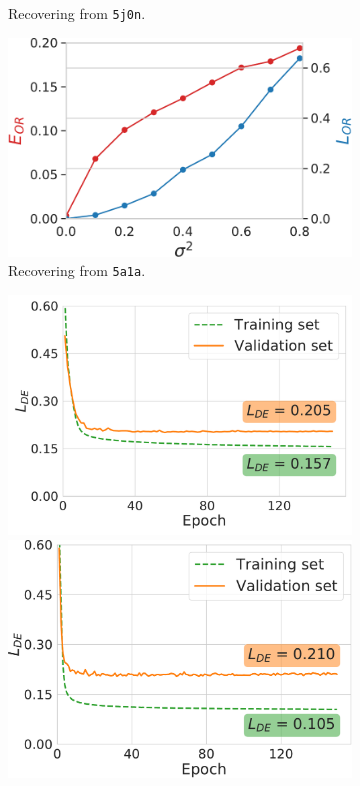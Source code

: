 \begin{figure}
\begin{minipage}[b]{0.48\linewidth}
\begin{subfigure}[b]{0.49\linewidth}
            \caption{Recovering from \texttt{5j0n}.}
        \end{subfigure}
        \hfill
        \begin{subfigure}[b]{0.49\linewidth}
        \centering
            \includegraphics[width=\linewidth]{figures/5a1a_perfect_noisy_ar_aa}
            \caption{Recovering from \texttt{5a1a}.}
        \end{subfigure}
        \caption{%
            Orientation recovery from perturbed distances.
        }\label{fig:perfect-with-noise-ar-aa}
    \end{minipage}
    \hfill
    \begin{minipage}[b]{0.45\linewidth}
        \begin{subfigure}[b]{\linewidth}
            \centering
            \includegraphics[width=0.47\linewidth]{figures/de_5j0n_fullcov.pdf}
            \hfill
            \includegraphics[width=0.47\linewidth]{figures/de_5a1a.pdf}

\end{subfigure}
\end{minipage}
\end{figure}
